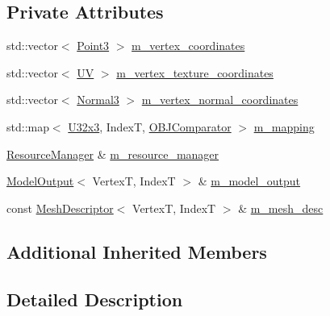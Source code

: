 \subsection*{Private Attributes}
\begin{DoxyCompactItemize}
\item 
std\+::vector$<$ \mbox{\hyperlink{structmage_1_1_point3}{Point3}} $>$ \mbox{\hyperlink{classmage_1_1rendering_1_1loader_1_1_o_b_j_reader_a393e0932f169a786e38f120fc6f0d84b}{m\+\_\+vertex\+\_\+coordinates}}
\item 
std\+::vector$<$ \mbox{\hyperlink{structmage_1_1_u_v}{UV}} $>$ \mbox{\hyperlink{classmage_1_1rendering_1_1loader_1_1_o_b_j_reader_aed919290e638cbe00a9144fdcb652178}{m\+\_\+vertex\+\_\+texture\+\_\+coordinates}}
\item 
std\+::vector$<$ \mbox{\hyperlink{structmage_1_1_normal3}{Normal3}} $>$ \mbox{\hyperlink{classmage_1_1rendering_1_1loader_1_1_o_b_j_reader_ac977ade8154bef446524526e8297f3eb}{m\+\_\+vertex\+\_\+normal\+\_\+coordinates}}
\item 
std\+::map$<$ \mbox{\hyperlink{namespacemage_a03e3b6f65630005f43a3112d1f6cf57b}{U32x3}}, IndexT, \mbox{\hyperlink{structmage_1_1rendering_1_1loader_1_1_o_b_j_reader_1_1_o_b_j_comparator}{O\+B\+J\+Comparator}} $>$ \mbox{\hyperlink{classmage_1_1rendering_1_1loader_1_1_o_b_j_reader_a4bad8aafabddb5cec68be8357d2d7566}{m\+\_\+mapping}}
\item 
\mbox{\hyperlink{classmage_1_1rendering_1_1_resource_manager}{Resource\+Manager}} \& \mbox{\hyperlink{classmage_1_1rendering_1_1loader_1_1_o_b_j_reader_ae6208964e05f3e93eb9939942fe3b55c}{m\+\_\+resource\+\_\+manager}}
\item 
\mbox{\hyperlink{structmage_1_1rendering_1_1_model_output}{Model\+Output}}$<$ VertexT, IndexT $>$ \& \mbox{\hyperlink{classmage_1_1rendering_1_1loader_1_1_o_b_j_reader_a645fca7c3f7f9860cb879f4088c4f8fc}{m\+\_\+model\+\_\+output}}
\item 
const \mbox{\hyperlink{classmage_1_1rendering_1_1_mesh_descriptor}{Mesh\+Descriptor}}$<$ VertexT, IndexT $>$ \& \mbox{\hyperlink{classmage_1_1rendering_1_1loader_1_1_o_b_j_reader_aa029c035456ea9456d63726b15e5db05}{m\+\_\+mesh\+\_\+desc}}
\end{DoxyCompactItemize}
\subsection*{Additional Inherited Members}


\subsection{Detailed Description}
